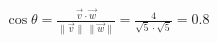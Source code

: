 \documentclass[preview]{standalone}
\begin{document}
\begin{align*}
\cos \theta  = \frac{ \vec v  \cdot  \vec w }{\lVert \vec v \rVert \,\lVert \vec w \rVert}= \frac{4}{\sqrt5 \cdot \sqrt5}=0.8
\end{align*}
\end{document}
